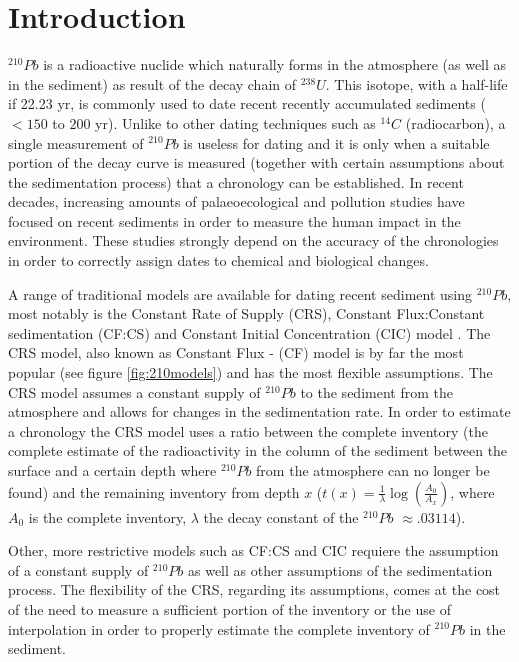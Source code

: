 \documentclass [10pt] {article}
\begin{document}
\section{Introduction}

$^{210}Pb$ is a radioactive nuclide which naturally forms in the atmosphere (as well as in the sediment) as result of the decay chain of $^{238}U$. 
This isotope, with a half-life if 22.23 yr, is commonly used to date recent recently accumulated sediments ($<150$ to $200$ yr). 
Unlike to other dating techniques such as $^{14}C$ (radiocarbon), a single measurement of $^{210}Pb$ is useless for dating and it is only when a suitable portion of the decay curve is measured (together with certain assumptions about the sedimentation process) that a chronology can be established.  
In recent decades, increasing amounts of palaeoecological and pollution studies have focused on recent sediments \citep[e.g.,][]{Courtney2019} in order to measure the human impact in the environment.
These studies strongly depend on the accuracy of the chronologies in order to correctly assign dates to chemical and biological changes.

A range of traditional models are available for dating recent sediment using $^{210}Pb$, most notably is the Constant Rate of Supply (CRS), Constant Flux:Constant sedimentation (CF:CS) and Constant Initial Concentration (CIC) model \citep{Appleby1978,Robbins1978,Sanchez-Cabeza2012} . 
The CRS model, also known as Constant Flux - (CF) model is by far the most popular (see figure \ref{fig:210models}) and has the most flexible assumptions. 
The CRS model assumes a constant supply of $^{210}Pb$ to the sediment from the atmosphere and allows for changes in the sedimentation rate. 
In order to estimate a chronology the CRS model uses a ratio between the complete inventory (the complete estimate of the radioactivity in the column of the sediment between the surface and a certain depth where $^{210}Pb$ from the atmosphere can no longer be found) and the remaining  inventory from depth $x$ ($t(x)=\frac{1}{\lambda}\log\left( \frac{A_0}{A_x}\right)$, where $A_0$ is the complete inventory, $\lambda$ the decay constant of the $^{210}Pb$ $\approx .03114$).

Other, more restrictive models such as CF:CS and CIC requiere the assumption of a constant supply of $^{210}Pb$ as well as other assumptions of the sedimentation process. 
The flexibility of the CRS, regarding its assumptions, comes at the cost of the need to measure a sufficient portion of the inventory or the use of interpolation in order to properly estimate the complete inventory of $^{210}Pb$ in the sediment. 
\end{document}
